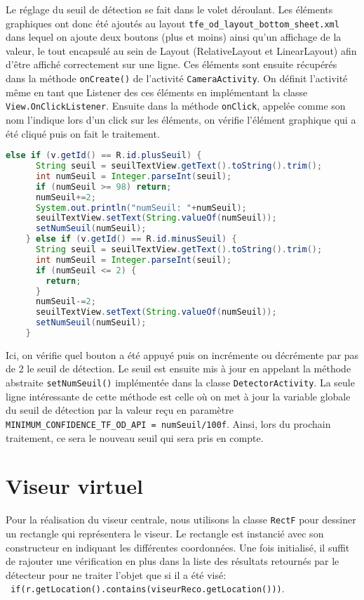 \documentclass[UTF8]{EPURapport}
\begin{document}
Le réglage du seuil de détection se fait dans le volet déroulant. Les éléments graphiques ont donc été ajoutés au layout \verb|tfe_od_layout_bottom_sheet.xml| dans lequel on ajoute deux boutons (plus et moins) ainsi qu'un affichage de la valeur, le tout encapsulé au sein de Layout (RelativeLayout et LinearLayout) afin d'être affiché correctement sur une ligne. Ces éléments sont ensuite récupérés dans la méthode \verb|onCreate()| de l'activité \verb|CameraActivity|. On définit l'activité même en tant que Listener des ces éléments en implémentant la classe \verb|View.OnClickListener|. Ensuite dans la méthode \verb|onClick|, appelée comme son nom l'indique lors d'un click sur les éléments, on vérifie l'élément graphique qui a été cliqué puis on fait le traitement.

\begin{lstlisting}[language=Java]
	else if (v.getId() == R.id.plusSeuil) {
      String seuil = seuilTextView.getText().toString().trim();
      int numSeuil = Integer.parseInt(seuil);
      if (numSeuil >= 98) return;
      numSeuil+=2;
      System.out.println("numSeuil: "+numSeuil);
      seuilTextView.setText(String.valueOf(numSeuil));
      setNumSeuil(numSeuil);
    } else if (v.getId() == R.id.minusSeuil) {
      String seuil = seuilTextView.getText().toString().trim();
      int numSeuil = Integer.parseInt(seuil);
      if (numSeuil <= 2) {
        return;
      }
      numSeuil-=2;
      seuilTextView.setText(String.valueOf(numSeuil));
      setNumSeuil(numSeuil);
    }
\end{lstlisting}

Ici, on vérifie quel bouton a été appuyé puis on incrémente ou décrémente par pas de 2 le seuil de détection. Le seuil est ensuite mis à jour en appelant la méthode abstraite \verb|setNumSeuil()| implémentée dans la classe \verb|DetectorActivity|. La seule ligne intéressante de cette méthode est celle où on met à jour la variable globale du seuil de détection par la valeur reçu en paramètre \verb|MINIMUM_CONFIDENCE_TF_OD_API = numSeuil/100f|. Ainsi, lors du prochain traitement, ce sera le nouveau seuil qui sera pris en compte.

\section{Viseur virtuel}

Pour la réalisation du viseur centrale, nous utilisons la classe \verb|RectF| pour dessiner un rectangle qui représentera le viseur. Le rectangle est instancié avec son constructeur en indiquant les différentes coordonnées. Une fois initialisé, il suffit de rajouter une vérification en plus dans la liste des résultats retournés par le détecteur pour ne traiter l'objet que si il a été visé:\\ \verb| if(r.getLocation().contains(viseurReco.getLocation()))|. 
\end{document}
